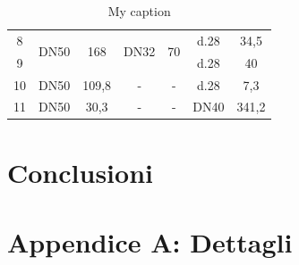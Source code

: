 \documentclass[laurea,oneside,11pt]{USiena_tesiLM}
\begin{document}
\begin{table}[]
\begin{tabular}{|c|c|c|c|c|c|c|}
8                                             & \multirow{2}{*}{DN50} & \multirow{2}{*}{168}                   & \multirow{2}{*}{DN32}     & \multirow{2}{*}{70}   & d.28         & 34,5                      \\ \cline{1-1} \cline{6-7} 
9                                             &                       &                                        &                           &                       & d.28         & 40                        \\ \hline
10                                            & DN50                  & 109,8                                  & -                         & -                     & d.28         & 7,3                       \\ \hline
11                                            & DN50                  & 30,3                                   & -                         & -                     & DN40         & 341,2                     \\ \hline
\end{tabular}
\caption{My caption}
\label{tab:rete_ippolito}
\end{table}
\chapter{Conclusioni}


\backmatter

\appendix
\chapter{Appendice A: Dettagli}
%


%



%

\end{document}
